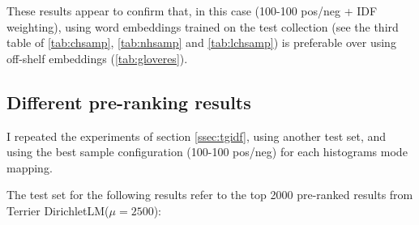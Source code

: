 These results appear to confirm that, in this case (100-100 pos/neg + IDF weighting), using word embeddings trained on the test collection (see the third table of \ref{tab:chsamp}, \ref{tab:nhsamp} and \ref{tab:lchsamp}) is preferable over using off-shelf embeddings (\ref{tab:gloveres}).

\subsection{Different pre-ranking results}

I repeated the experiments of section \ref{ssec:tgidf}, using another test set, and using the best sample configuration (100-100 pos/neg) for each histograms mode mapping.

The test set for the following results refer to the top 2000 pre-ranked results from Terrier DirichletLM($\mu = 2500$):

